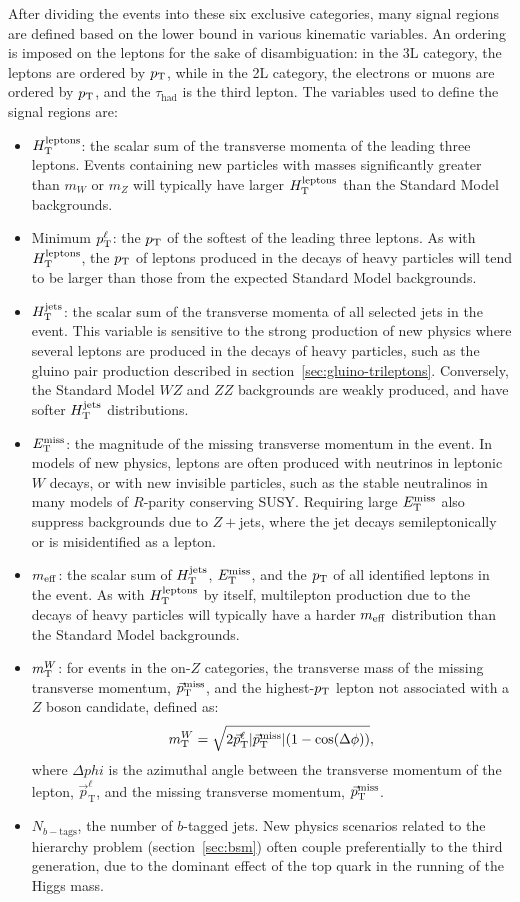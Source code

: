 After dividing the events into these six exclusive categories, many signal regions are defined based on the lower bound in various kinematic variables. An ordering is imposed on the leptons for the sake of disambiguation: in the 3L category, the leptons are ordered by $p_{\text{T}}$, while in the 2L category, the electrons or muons are ordered by $p_{\text{T}}$, and the $\tau_{\mathrm{had}}$ is the third lepton.  The variables used to define the signal regions are:

\begin{itemize}
	\item $H_{\mathrm{T}}^{\mathrm{leptons}}$: the scalar sum of the transverse momenta of the leading three leptons. Events containing new particles with masses significantly greater than $m_W$ or $m_Z$ will typically have larger $H_{\mathrm{T}}^{\mathrm{leptons}}$ than the Standard Model backgrounds.
	\item Minimum $p_{\text{T}}^{\ell}$: the $p_{\text{T}}$ of the softest of the leading three leptons. As with $H_{\mathrm{T}}^{\mathrm{leptons}}$, the $p_{\text{T}}$ of leptons produced in the decays of heavy particles will tend to be larger than those from the expected Standard Model backgrounds.
	\item $H_{\mathrm{T}}^{\mathrm{jets}}$: the scalar sum of the transverse momenta of all selected jets in the event. This variable is sensitive to the strong production of new physics where several leptons are produced in the decays of heavy particles, such as the gluino pair production described in section~\ref{sec:gluino-trileptons}. Conversely, the Standard Model $WZ$ and $ZZ$ backgrounds are weakly produced, and have softer $H_{\mathrm{T}}^{\mathrm{jets}}$ distributions.
	\item $E_{\text{T}}^{\text{miss}}$: the magnitude of the missing transverse momentum in the event. In models of new physics, leptons are often produced with neutrinos in leptonic $W$ decays, or with new invisible particles, such as the stable neutralinos in many models of $R$-parity conserving SUSY. Requiring large $E_{\text{T}}^{\text{miss}}$ also suppress backgrounds due to $Z+$jets, where the jet decays semileptonically or is misidentified as a lepton. 
	\item $m_{\mathrm{eff}}$: the scalar sum of $H_{\mathrm{T}}^{\mathrm{jets}}$, $E_{\text{T}}^{\text{miss}}$, and the $p_{\text{T}}$ of all identified leptons in the event. As with $H_{\mathrm{T}}^{\mathrm{leptons}}$ by itself, multilepton production due to the decays of heavy particles will typically have a harder $m_{\mathrm{eff}}$ distribution than the Standard Model backgrounds.
	\item $m_{\mathrm{T}}^W$: for events in the on-$Z$ categories, the transverse mass of the missing transverse momentum, $\vec{p}_{\mathrm{T}}^{\mathrm{miss}}$, and the highest-$p_{\text{T}}$ lepton not associated with a $Z$ boson candidate, defined as:
	\begin{equation}
		m_{\mathrm{T}}^W = \sqrt{2 \vec{p}_{\mathrm{T}}^{\ell}|\vec{p}_{\mathrm{T}}^{\mathrm{miss}}|(1-\cos(\Delta\phi))},
	\end{equation}
	where $\Delta phi$ is the azimuthal angle between the transverse momentum of the lepton, $\vec{p}_{\mathrm{T}}^{\ell}$, and the missing transverse momentum, $\vec{p}_{\mathrm{T}}^{\mathrm{miss}}$. 
	\item $N_{b-\mathrm{tags}}$, the number of $b$-tagged jets. New physics scenarios related to the hierarchy problem (section~\ref{sec:bsm}) often couple preferentially to the third generation, due to the dominant effect of the top quark in the running of the Higgs mass. 
\end{itemize}

